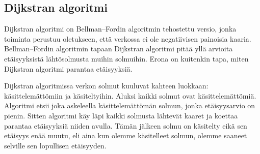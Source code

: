\subsection{Dijkstran algoritmi}

Dijkstran algoritmi on Bellman–Fordin algoritmin tehostettu versio,
jonka toiminta perustuu oletukseen, että verkossa ei ole
negatiivisen painoisia kaaria.
Bellman–Fordin algoritmin tapaan Dijkstran algoritmi pitää
yllä arvioita etäisyyksistä lähtösolmusta muihin solmuihin.
Erona on kuitenkin tapa, miten Dijkstran algoritmi parantaa etäisyyksiä.

Dijkstran algoritmissa verkon solmut kuuluvat kahteen luokkaan:
käsitte\-lemättömiin ja käsiteltyihin.
Aluksi kaikki solmut ovat käsittelemättömiä.
Algoritmi etsii joka askeleella käsittelemättömän solmun,
jonka etäisyys\-arvio on pienin.
Sitten algoritmi käy läpi kaikki solmusta lähtevät kaaret ja
koettaa parantaa etäisyyksiä niiden avulla.
Tämän jälkeen solmu on käsitelty eikä sen etäisyys enää muutu,
eli aina kun olemme käsitelleet solmun,
olemme saaneet selville sen lopullisen etäisyyden.

